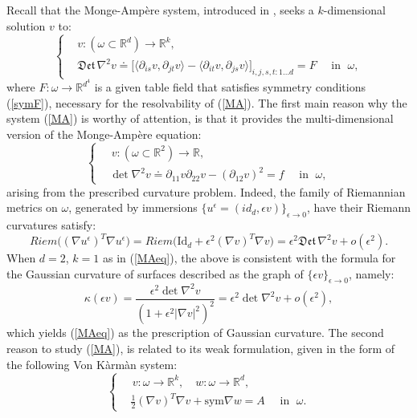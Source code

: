 \documentclass[reqno,twoside,11pt]{amsart}
\newcommand{\sym}{\mathrm{sym}}
\newcommand{\R}{\mathbb{R}}
\numberwithin{equation}{section}
\theoremstyle{plain}
\theoremstyle{definition}
\begin{document}
\noindent Recall that the Monge-Amp\`ere system, introduced in \cite{lew_conv},
seeks a $k$-dimensional solution $v$ to:
\begin{equation}\label{MA}
\left\{\begin{split}
& v:(\omega\subset\R^d)\to \R^k, 
\\ & \mathfrak{Det} \,\nabla^2v \doteq \big[\langle \partial_{is}
v, \partial_{jt}v\rangle -\langle \partial_{it}v, \partial_{js}v\rangle\big]_{i,j,
  s,t:1\ldots d}= F\quad\mbox{ in }\;\omega,
\end{split}\right.
\end{equation}
where $F:\omega\to\R^{d^4}$ is a given table field that satisfies
symmetry conditions (\ref{symF}), necessary for the resolvability of (\ref{MA}).
The first main reason why the system (\ref{MA}) is worthy of
attention, is that it provides the multi-dimensional version of the Monge-Amp\`ere equation:
\begin{equation}\label{MAeq}
\left\{\begin{split}
& \, v:(\omega\subset\R^2)\to \R, 
\\ & \det\nabla^2 v  \doteq \partial_{11}
v  \partial_{22} v - (\partial_{12} v)^2 = f\quad\mbox{ in }\;\omega,
\end{split}\right.
\end{equation} 
arising from the prescribed curvature problem. Indeed, the family of Riemannian metrics on $\omega$, generated by immersions $\{u^\epsilon=(id_d, \epsilon
v)\}_{\epsilon\to 0}$, have their Riemann curvatures satisfy:
\begin{equation*}
{Riem}\big((\nabla u^\epsilon)^T\nabla u^\epsilon\big)  =
{Riem}\big(\mbox{Id}_d + \epsilon^2(\nabla v)^T\nabla v\big) 
= \epsilon^2 \mathfrak{Det} \,\nabla^2v + o(\epsilon^2).
\end{equation*}
When $d=2$, $k=1$ as in (\ref{MAeq}), the above is consistent with the
formula for the Gaussian curvature of surfaces described as the 
graph of $\{\epsilon v\}_{\epsilon\to 0}$, namely:
$$\kappa(\epsilon v) = \frac{\epsilon^2 \det\nabla^2 v}{(1+\epsilon^2|\nabla
  v|^2)^2} = \epsilon^2 \det\nabla^2v + o(\epsilon^2),$$
which yields (\ref{MAeq}) as the prescription of Gaussian curvature.
The second reason to study (\ref{MA}), is related to its weak formulation, given in the form of the
following Von K\`arm\`an system:
\begin{equation}\label{VK}
\left\{\begin{split}
&\,  v:\omega\to \R^k, \quad w:\omega\to\R^d,
\\ & \frac{1}{2}(\nabla v)^T\nabla v + \sym \nabla w = A\quad\mbox{ in }\;\omega.
\end{split}\right.
\end{equation}
\end{document}
